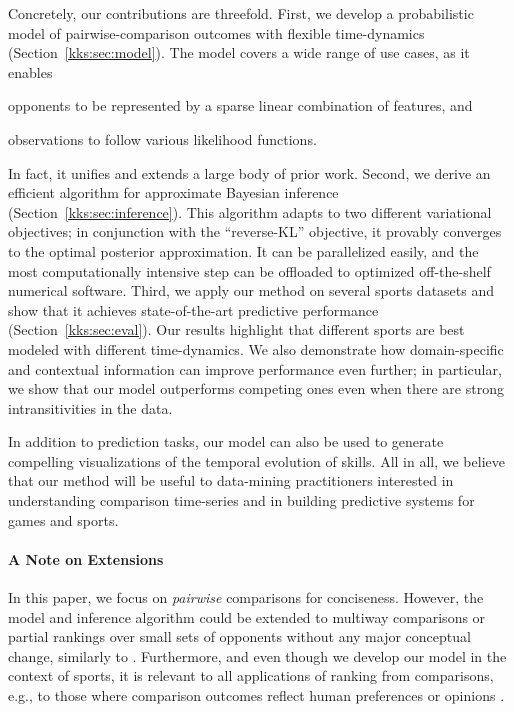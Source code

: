 Concretely, our contributions are threefold.
First, we develop a probabilistic model of pairwise-comparison outcomes with flexible time-dynamics (Section~\ref{kks:sec:model}).
The model covers a wide range of use cases, as it enables
\begin{enuminline}
\item opponents to be represented by a sparse linear combination of features, and
\item observations to follow various likelihood functions.
\end{enuminline}
In fact, it unifies and extends a large body of prior work.
Second, we derive an efficient algorithm for approximate Bayesian inference (Section~\ref{kks:sec:inference}).
This algorithm adapts to two different variational objectives;
in conjunction with the ``reverse-KL'' objective, it provably converges to the optimal posterior approximation.
It can be parallelized easily, and the most computationally intensive step can be offloaded to optimized off-the-shelf numerical software.
Third, we apply our method on several sports datasets and show that it achieves state-of-the-art predictive performance (Section~\ref{kks:sec:eval}).
Our results highlight that different sports are best modeled with different time-dynamics.
We also demonstrate how domain-specific and contextual information can improve performance even further;
in particular, we show that our model outperforms competing ones even when there are strong intransitivities in the data.

In addition to prediction tasks, our model can also be used to generate compelling visualizations of the temporal evolution of skills.
All in all, we believe that our method will be useful to data-mining practitioners interested in understanding comparison time-series and in building predictive systems for games and sports.

\paragraph{A Note on Extensions}
In this paper, we focus on \emph{pairwise} comparisons for conciseness.
However, the model and inference algorithm could be extended to multiway comparisons or partial rankings over small sets of opponents without any major conceptual change, similarly to \citet{herbrich2006trueskill}.
Furthermore, and even though we develop our model in the context of sports, it is relevant to all applications of ranking from comparisons, e.g., to those where comparison outcomes reflect human preferences or opinions \citep{thurstone1927law, mcfadden1973conditional, salganik2015wiki}.
